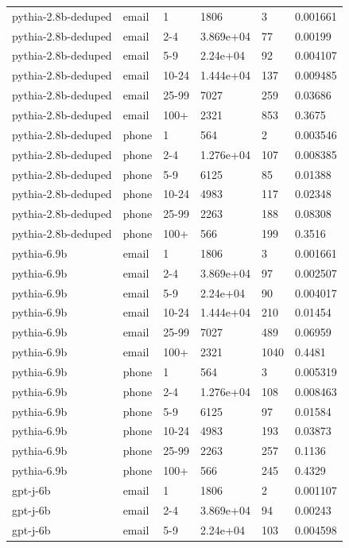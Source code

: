 \begin{tabular}{llllll}
pythia-2.8b-deduped & email & 1 & 1806 & 3 & 0.001661 \\
pythia-2.8b-deduped & email & 2-4 & 3.869e+04 & 77 & 0.00199 \\
pythia-2.8b-deduped & email & 5-9 & 2.24e+04 & 92 & 0.004107 \\
pythia-2.8b-deduped & email & 10-24 & 1.444e+04 & 137 & 0.009485 \\
pythia-2.8b-deduped & email & 25-99 & 7027 & 259 & 0.03686 \\
pythia-2.8b-deduped & email & 100+ & 2321 & 853 & 0.3675 \\
pythia-2.8b-deduped & phone & 1 & 564 & 2 & 0.003546 \\
pythia-2.8b-deduped & phone & 2-4 & 1.276e+04 & 107 & 0.008385 \\
pythia-2.8b-deduped & phone & 5-9 & 6125 & 85 & 0.01388 \\
pythia-2.8b-deduped & phone & 10-24 & 4983 & 117 & 0.02348 \\
pythia-2.8b-deduped & phone & 25-99 & 2263 & 188 & 0.08308 \\
pythia-2.8b-deduped & phone & 100+ & 566 & 199 & 0.3516 \\
pythia-6.9b & email & 1 & 1806 & 3 & 0.001661 \\
pythia-6.9b & email & 2-4 & 3.869e+04 & 97 & 0.002507 \\
pythia-6.9b & email & 5-9 & 2.24e+04 & 90 & 0.004017 \\
pythia-6.9b & email & 10-24 & 1.444e+04 & 210 & 0.01454 \\
pythia-6.9b & email & 25-99 & 7027 & 489 & 0.06959 \\
pythia-6.9b & email & 100+ & 2321 & 1040 & 0.4481 \\
pythia-6.9b & phone & 1 & 564 & 3 & 0.005319 \\
pythia-6.9b & phone & 2-4 & 1.276e+04 & 108 & 0.008463 \\
pythia-6.9b & phone & 5-9 & 6125 & 97 & 0.01584 \\
pythia-6.9b & phone & 10-24 & 4983 & 193 & 0.03873 \\
pythia-6.9b & phone & 25-99 & 2263 & 257 & 0.1136 \\
pythia-6.9b & phone & 100+ & 566 & 245 & 0.4329 \\
gpt-j-6b & email & 1 & 1806 & 2 & 0.001107 \\
gpt-j-6b & email & 2-4 & 3.869e+04 & 94 & 0.00243 \\
gpt-j-6b & email & 5-9 & 2.24e+04 & 103 & 0.004598 \\

\end{tabular}
